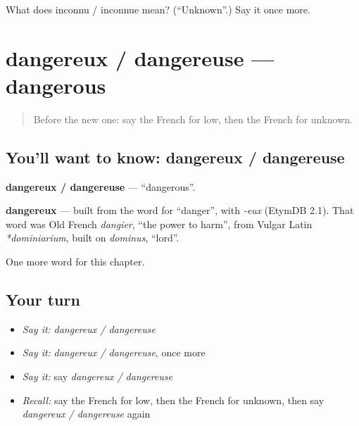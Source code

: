 \begin{tcolorbox}[breakable,colback=teal!4,colframe=teal!35!black,title={Before you move on}]
What does inconnu / inconnue mean? (\textquotedblleft{}Unknown\textquotedblright{}.) Say it once more.
\end{tcolorbox}
\section[dangereux / dangereuse]{dangereux / dangereuse — dangerous}

\label{lesson:FR-C160-dangereux-dangereuse}



\begin{quote}
Before the new one: say the French for low, then the French for unknown.
\end{quote}

\subsection*{You'll want to know: dangereux / dangereuse}
\textbf{dangereux / dangereuse} — \textquotedblleft{}dangerous\textquotedblright{}.

\begin{cousinweb}
\textbf{dangereux} — built from the word for \textquotedblleft{}danger\textquotedblright{}, with \emph{-eux} (EtymDB 2.1). That word was Old French \emph{dangier}, \textquotedblleft{}the power to harm\textquotedblright{}, from Vulgar Latin \emph{*dominiarium}, built on \emph{dominus}, \textquotedblleft{}lord\textquotedblright{}.
\end{cousinweb}

\begin{grammarlens}[title={What you've built}]
One more word for this chapter.
\end{grammarlens}

\subsection*{Your turn}
\begin{itemize}
\raggedright
  \item \emph{Say it:} \emph{dangereux / dangereuse}
  \item \emph{Say it:} \emph{dangereux / dangereuse}, once more
  \item \emph{Say it:} say \emph{dangereux / dangereuse}
  \item \emph{Recall:} say the French for low, then the French for unknown, then say \emph{dangereux / dangereuse} again
\end{itemize}

